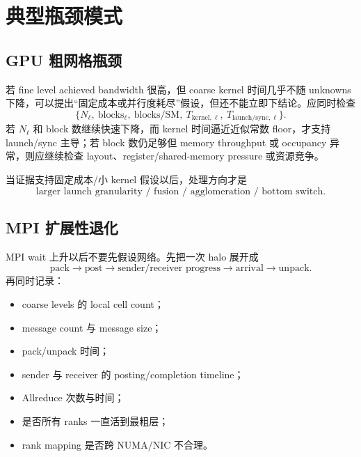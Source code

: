 \section{典型瓶颈模式}

\subsection{GPU 粗网格瓶颈}

若 fine level achieved bandwidth 很高，但 coarse kernel 时间几乎不随 unknowns 下降，可以提出“固定成本或并行度耗尽”假设，但还不能立即下结论。应同时检查
\begin{equation}
\{N_\ell,\ \text{blocks}_\ell,\ \text{blocks/SM},\ T_{\mathrm{kernel},\ell},\ T_{\mathrm{launch/sync},\ell}\}.
\end{equation}
若 $N_\ell$ 和 block 数继续快速下降，而 kernel 时间逼近近似常数 floor，才支持 launch/sync 主导；若 block 数仍足够但 memory throughput 或 occupancy 异常，则应继续检查 layout、register/shared-memory pressure 或资源竞争。

当证据支持固定成本/小 kernel 假设以后，处理方向才是
\begin{equation}
\text{larger launch granularity / fusion / agglomeration / bottom switch}.
\end{equation}

\subsection{MPI 扩展性退化}

MPI wait 上升以后不要先假设网络。先把一次 halo 展开成
\begin{equation}
\text{pack}
\rightarrow
\text{post}
\rightarrow
\text{sender/receiver progress}
\rightarrow
\text{arrival}
\rightarrow
\text{unpack}.
\end{equation}
再同时记录：
\begin{itemize}
\item coarse levels 的 local cell count；
\item message count 与 message size；
\item pack/unpack 时间；
\item sender 与 receiver 的 posting/completion timeline；
\item Allreduce 次数与时间；
\item 是否所有 ranks 一直活到最粗层；
\item rank mapping 是否跨 NUMA/NIC 不合理。
\end{itemize}

